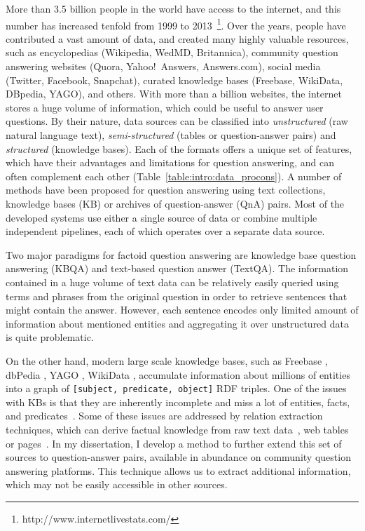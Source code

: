 More than 3.5 billion people in the world have access to the internet, and this number has increased tenfold from 1999 to 2013~\footnote{http://www.internetlivestats.com/}.
Over the years, people have contributed a vast amount of data, and created many highly valuable resources, such as encyclopedias (Wikipedia, WedMD, Britannica), community question answering websites (Quora, Yahoo!~Answers, Answers.com), social media (Twitter, Facebook, Snapchat), curated knowledge bases (Freebase, WikiData, DBpedia, YAGO), and others.
With more than a billion websites, the internet stores a huge volume of information, which could be useful to answer user questions.
By their nature, data sources can be classified into \textit{unstructured} (\eg raw natural language text), \textit{semi-structured} (\eg tables or question-answer pairs) and \textit{structured} (\eg knowledge bases).
Each of the formats offers a unique set of features, which have their advantages and limitations for question answering, and can often complement each other (Table~\ref{table:intro:data_procons}).
A number of methods have been proposed for question answering using text collections, knowledge bases (KB) or archives of question-answer (QnA) pairs.
Most of the developed systems use either a single source of data or combine multiple independent pipelines, each of which operates over a separate data source.

Two major paradigms for factoid question answering are knowledge base question answering (KBQA) and text-based question answer (TextQA).
The information contained in a huge volume of text data can be relatively easily queried using terms and phrases from the original question in order to retrieve sentences that might contain the answer.
However, each sentence encodes only limited amount of information about mentioned entities and aggregating it over unstructured data is quite problematic.

On the other hand, modern large scale knowledge bases, such as Freebase \cite{Bollacker:2008:FCC:1376616.1376746}, dbPedia \cite{auer2007dbpedia}, YAGO \cite{yago3}, WikiData \cite{vrandevcic2014wikidata}, accumulate information about millions of entities into a graph of \texttt{[subject, predicate, object]} RDF triples.
One of the issues with KBs is that they are inherently incomplete and miss a lot of entities, facts, and predicates~\cite{Dong:2014:KVW:2623330.2623623}.
Some of these issues are addressed by relation extraction techniques, which can derive factual knowledge from raw text data~\cite{MintzBSJ09}, web tables~\cite{Cafarella:2008:WEP:1453856.1453916} or pages~\cite{Cafarella:2009:WES:1519103.1519112}.
In my dissertation, I develop a method to further extend this set of sources to question-answer pairs, available in abundance on community question answering platforms.
This technique allows us to extract additional information, which may not be easily accessible in other sources.

